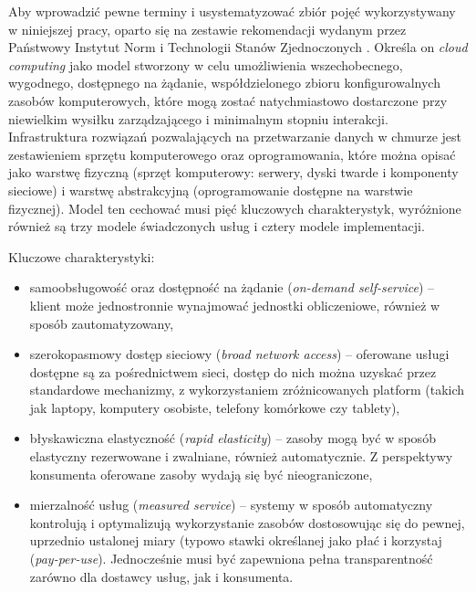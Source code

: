 \documentclass[12pt,a4paper,twoside]{article}
\begin{document}
Aby wprowadzić pewne terminy i usystematyzować zbiór pojęć wykorzystywany w niniejszej pracy, oparto się na zestawie rekomendacji wydanym przez Państwowy Instytut Norm i Technologii Stanów Zjednoczonych \citep{mell2011}. Określa on \textit{cloud computing} jako model stworzony w celu umożliwienia wszechobecnego, wygodnego, dostępnego na żądanie, współdzielonego zbioru konfigurowalnych zasobów komputerowych, które mogą zostać natychmiastowo dostarczone przy niewielkim wysiłku zarządzającego i minimalnym stopniu interakcji. Infrastruktura rozwiązań pozwalających na przetwarzanie danych w chmurze jest zestawieniem sprzętu komputerowego oraz oprogramowania, które można opisać jako warstwę fizyczną (sprzęt komputerowy: serwery, dyski twarde i komponenty sieciowe) i warstwę abstrakcyjną (oprogramowanie dostępne na warstwie fizycznej). Model ten cechować musi pięć kluczowych charakterystyk, wyróżnione również są trzy modele świadczonych usług i cztery modele implementacji.

\noindent
Kluczowe charakterystyki:
\begin{itemize}
\item samoobsługowość oraz dostępność na żądanie (\textit{on-demand self-service}) -- klient może jednostronnie wynajmować jednostki obliczeniowe, również w sposób zautomatyzowany,
\item szerokopasmowy dostęp sieciowy (\textit{broad network access}) -- oferowane usługi dostępne są za pośrednictwem sieci, dostęp do nich można uzyskać przez standardowe mechanizmy, z wykorzystaniem zróżnicowanych platform (takich jak laptopy, komputery osobiste, telefony komórkowe czy tablety),
\item błyskawiczna elastyczność (\textit{rapid elasticity}) -- zasoby mogą być w sposób elastyczny rezerwowane i zwalniane, również automatycznie. Z perspektywy konsumenta oferowane zasoby wydają się być nieograniczone,
\item mierzalność usług (\textit{measured service}) -- systemy w sposób automatyczny kontrolują i optymalizują wykorzystanie zasobów dostosowując się do pewnej, uprzednio ustalonej miary (typowo stawki określanej jako płać i korzystaj (\textit{pay-per-use}). Jednocześnie musi być zapewniona pełna transparentność zarówno dla dostawcy usług, jak i konsumenta.
\end{itemize}
\end{document}
